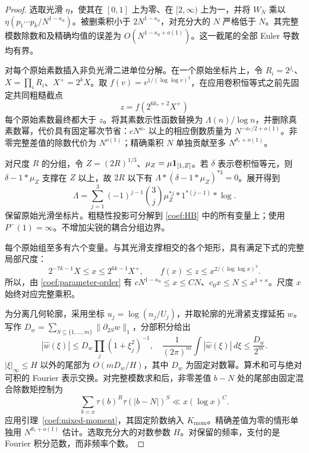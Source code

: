 \begin{proof}
选取光滑 $\eta$，使其在 $[0,1]$ 上为零、在 $[2,\infty)$ 上为一，并将 $W_N$ 乘以 $\eta(p_1\cdots p_k/N^{1-\kappa_0})$。被删乘积小于 $2N^{1-\kappa_0}$，对充分大的 $N$ 严格低于 $N$。其完整模数除数和及精确均值的误差为 $O(N^{1-\kappa_0+o(1)})$。这一截尾的全部 Euler 导数均有界。

对每个原始素数插入非负光滑二进单位分解。在一个原始坐标片上，令 $R_i=2^{j_i}$、$X=\prod_iR_i$、$X^+=2^kX$。取 $f(v)=v^{1/(\log\log v)^3}$，在应用卷积恒等式之前先固定共同粗糙截点
\[
 z=f(2^{6k_*+2}X^+)
\]
每个原始素数最终都大于 $z$。将其素数示性函数替换为 $\Lambda(n)/\log n$，并删除真素数幂，代价具有固定幂次节省：$cN^{a_*}$ 以上的相应倒数质量为 $N^{-a_*/2+o(1)}$。非零完整差值的除数代价为 $N^{o(1)}$；精确乘积 $N$ 单独贡献至多 $N^{\theta_*+o(1)}$。

对尺度 $R$ 的分组，令 $Z=(2R)^{1/3}$、$\mu_Z=\mu\mathbf 1_{[1,Z]}$。若 $\delta$ 表示卷积恒等元，则 $\delta-1*\mu_Z$ 支撑在 $Z$ 以上，故 $2R$ 以下有 $\Lambda*(\delta-1*\mu_Z)^{*3}=0$。展开得到
\begin{equation}
 \Lambda=\sum_{j=1}^3(-1)^{j-1}\binom3j
             \mu_Z^{*j}*1^{*(j-1)}*\log.
 \label{coef:HB}
\end{equation}
保留原始光滑坐标片。粗糙性投影可分解到 \eqref{coef:HB} 中的所有变量上；使用 $P^-(1)=\infty$。不增加尖锐的耦合分组边界。

每个原始组至多有六个变量。与其光滑支撑相交的各个矩形，具有满足下式的完整局部尺度：
\begin{equation}
 2^{-7k-1}X\le x\le2^{6k-1}X^+,
 \qquad f(x)\le z\le x^{2/(\log\log x)^3}.
 \label{coef:complete-scales}
\end{equation}
所以，由 \eqref{coef:parameter-order} 有 $cN^{1-\kappa_0}\le x\le CN$、$c_0x\le N\le x^{1+\kappa}$。尺度 $x$ 始终对应完整乘积。

为分离几何轮廓，采用坐标 $u_j=\log(n_j/U_j)$，并取轮廓的光滑紧支撑延拓 $w$。写作 $D_w=\sum_{S\subseteq\{1,\ldots,m\}}\|\partial_{2S}w\|_1$，分部积分给出
\[
 |\widehat w(\xi)|\le D_w\prod_j(1+\xi_j^2)^{-1},
 \quad \frac1{(2\pi)^m}\int|\widehat w(\xi)|\,d\xi
 \le\frac{D_w}{2^m}.
\]
$|\xi|_\infty\le H$ 以外的尾部为 $O(mD_w/H)$，其中 $D_w$ 为固定对数幂。算术和可与绝对可积的 Fourier 表示交换。对完整模数求和后，非零差值 $b-N$ 处的尾部由固定混合除数矩控制为
\[
 \sum_{b\asymp x}\tau(b)^R\tau(|b-N|)^S
 \ll x(\log x)^C.
\]
应用引理~\ref{coef:mixed-moment}，其固定阶数纳入 $K_{\mathrm{mom}}$。精确差值为零的情形单独用 $N^{\theta_*+o(1)}$ 估计。选取充分大的对数参数 $H$。对保留的频率，支付的是 Fourier 积分范数，而非频率个数。


\end{proof}

